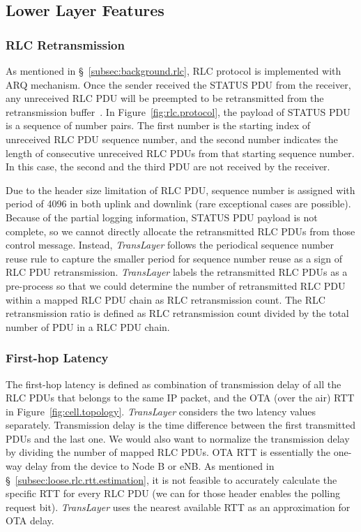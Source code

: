 \subsection{Lower Layer Features}
\label{subsec:lower.layer.features}

\subsubsection{RLC Retransmission}
As mentioned in \S~\ref{subsec:background.rlc}, RLC protocol is implemented with ARQ mechanism. Once the sender received the STATUS PDU from the receiver, any unreceived RLC PDU will be preempted to be retransmitted from the retransmission buffer~\cite{spec-3G-RLC}. In Figure~\ref{fig:rlc.protocol}, the payload of STATUS PDU is a sequence of number pairs. The first number is the starting index of unreceived RLC PDU sequence number, and the second number indicates the length of consecutive unreceived RLC PDUs from that starting sequence number. In this case, the second and the third PDU are not received by the receiver. 

Due to the header size limitation of RLC PDU, sequence number is assigned with period of 4096 in both uplink and downlink (rare exceptional cases are possible). Because of the partial logging information, STATUS PDU payload is not complete, so we cannot directly allocate the retransmitted RLC PDUs from those control message. Instead, \textit{TransLayer} follows the periodical sequence number reuse rule to capture the smaller period for sequence number reuse as a sign of RLC PDU retransmission. \textit{TransLayer} labels the retransmitted RLC PDUs as a pre-process so that we could determine the number of retransmitted RLC PDU within a mapped RLC PDU chain as RLC retransmission count. The RLC retransmission ratio is defined as RLC retransmission count divided by the total number of PDU in a RLC PDU chain.

\subsubsection{First-hop Latency}
The first-hop latency is defined as combination of transmission delay of all the RLC PDUs that belongs to the same IP packet, and the OTA (over the air) RTT in Figure~\ref{fig:cell.topology}. \textit{TransLayer} considers the two latency values separately. Transmission delay is the time difference between the first transmitted PDUs and the last one. We would also want to normalize the transmission delay by dividing the number of mapped RLC PDUs. OTA RTT is essentially the one-way delay from the device to Node B or eNB. As mentioned in \S~\ref{subsec:loose.rlc.rtt.estimation}, it is not feasible to accurately calculate the specific RTT for every RLC PDU (we can for those header enables the polling request bit). \textit{TransLayer} uses the nearest available RTT as an approximation for OTA delay.

